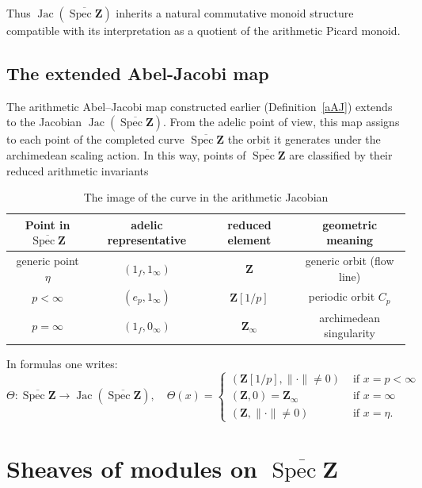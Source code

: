 \documentclass[11pt,a4paper]{article}
\newcommand{\Z}{\mathbf{Z}}
\def\spzb{\overline{\Spec \Z}}
\newcommand{\Spec}{\operatorname{Spec}}
\def\Jac{\operatorname{Jac}}
\theoremstyle{plain}
\theoremstyle{definition} %
\begin{document}
Thus $\Jac(\spzb)$ inherits a natural commutative monoid structure compatible with
its interpretation as a quotient of the arithmetic Picard monoid.

\subsection{The  extended Abel-Jacobi map}\label{sheaf}

The arithmetic Abel--Jacobi map  constructed earlier (Definition~\ref{aAJ}) extends to the Jacobian
$\Jac(\spzb)$.
From the adelic point of view, this map assigns to each point of the completed curve
$\spzb$ the orbit it generates under the archimedean scaling action.
In this way, points of $\spzb$ are classified by their reduced arithmetic
invariants

\begin{table}[H]
\centering
{\fontsize{10.3}{12.3}\selectfont
\begin{tabular}{c|c|c|c}
\textbf{Point in $\spzb$} & \textbf{adelic representative} & \textbf{reduced element} & \textbf{geometric meaning} \\
\hline
generic point $\eta$ & $(1_f, 1_\infty)$ & $\Z$ & generic orbit (flow line) \\
\hline
$p<\infty$ & $(e_p, 1_\infty)$ & $\Z[1/p]$ & periodic orbit $C_p$ \\
\hline
$p=\infty$ & $(1_f, 0_\infty)$ & $\Z_\infty$ & archimedean singularity \\
\hline
\end{tabular}
}
\caption{The image of the curve in the arithmetic Jacobian}\label{table}
\end{table}
In formulas one writes:
\begin{equation}\label{extAJ}
\Theta: \spzb \longrightarrow \Jac(\spzb), \quad\Theta(x)= \begin{cases}(\mathbf{Z}[1 / p],\|\cdot\|\neq 0) & \text { if } x=p<\infty  \\ (\mathbf{Z}, 0)=\Z_\infty & \text { if } x=\infty \\ (\mathbf{Z},\|\cdot\|\neq 0) & \text { if } x=\eta.\end{cases}
\end{equation}




\section{Sheaves of modules on $\spzb$}\label{sectsheaf}
\end{document}
